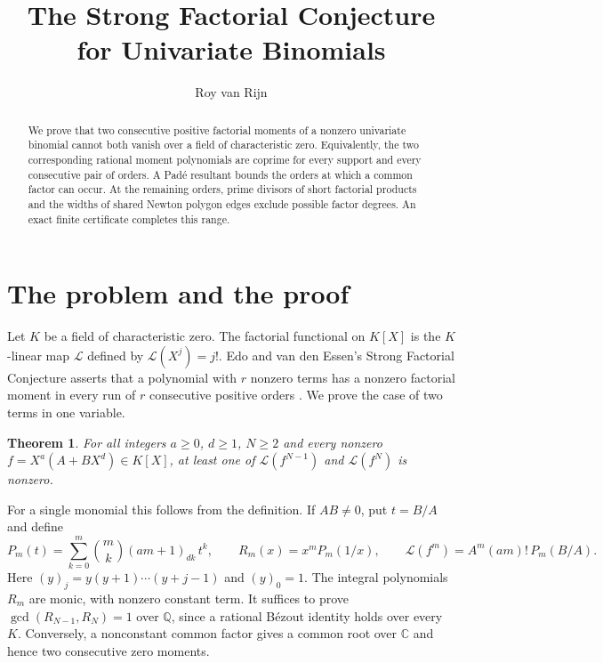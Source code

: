 \documentclass[11pt]{article}
\title{The Strong Factorial Conjecture for Univariate Binomials}
\author{Roy van Rijn}
\date{}
\newtheorem{theorem}{Theorem}
\theoremstyle{remark}
\newcommand{\Q}{\mathbb Q}
\newcommand{\C}{\mathbb C}
\begin{document}
\maketitle

\begin{abstract}
We prove that two consecutive positive factorial moments of a nonzero
univariate binomial cannot both vanish over a field of characteristic
zero. Equivalently, the two corresponding rational moment polynomials
are coprime for every support and every consecutive pair of orders.
A Pad\'e resultant bounds the orders at which a common factor can occur.
At the remaining orders, prime divisors of short factorial products
and the widths of shared Newton polygon edges exclude possible factor
degrees. An exact finite certificate completes this range.
\end{abstract}

\section{The problem and the proof}

Let \(K\) be a field of characteristic zero. The factorial functional on
\(K[X]\) is the \(K\)-linear map \(\mathcal L\) defined by
\(\mathcal L(X^j)=j!\). Edo and van den Essen's Strong Factorial
Conjecture asserts that a polynomial with \(r\) nonzero terms has a
nonzero factorial moment in every run of \(r\) consecutive positive
orders \cite{edo-essen}. We prove the case of two terms in one variable.

\begin{theorem}\label{thm:main}
For all integers \(a\ge0\), \(d\ge1\), \(N\ge2\) and every nonzero
\(f=X^a(A+BX^d)\in K[X]\), at least one of
\(\mathcal L(f^{N-1})\) and \(\mathcal L(f^N)\) is nonzero.
\end{theorem}

For a single monomial this follows from the definition. If \(AB\ne0\),
put \(t=B/A\) and define
\begin{equation}\label{eq:moment}
 P_m(t)=\sum_{k=0}^m\binom{m}{k}(am+1)_{dk}\,t^k,
 \qquad R_m(x)=x^m P_m(1/x),\qquad
 \mathcal L(f^m)=A^m(am)!\,P_m(B/A).
\end{equation}
Here \((y)_j=y(y+1)\cdots(y+j-1)\) and \((y)_0=1\).
The integral polynomials \(R_m\) are monic, with nonzero constant term.
It suffices to prove \(\gcd(R_{N-1},R_N)=1\) over \(\Q\),
since a rational B\'ezout identity holds over every \(K\).
Conversely, a nonconstant common factor gives a common root over
\(\C\) and hence two consecutive zero moments.
\end{document}
